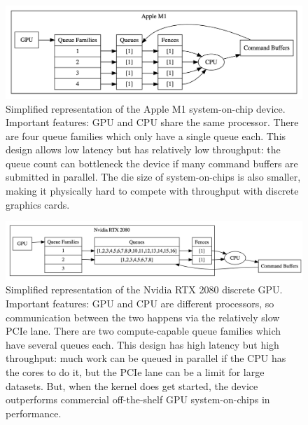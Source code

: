 \documentclass{report}
\begin{document}
\begin{figure}
  \centering
  \includegraphics[scale=0.25]{m1.png}
  \caption{Simplified representation of the Apple M1 system-on-chip device. Important features: GPU and CPU share the same processor. There are four queue families which only have a single queue each. This design allows low latency but has relatively low throughput: the queue count can bottleneck the device if many command buffers are submitted in parallel. The die size of system-on-chips is also smaller, making it physically hard to compete with throughput with discrete graphics cards.}
  \label{fig:m1}
\end{figure}

\begin{figure}
  \centering
  \includegraphics[scale=0.25]{rtx.png}
  \caption{Simplified representation of the Nvidia RTX 2080 discrete GPU. Important features: GPU and CPU are different processors, so communication between the two happens via the relatively slow PCIe lane. There are two compute-capable queue families which have several queues each. This design has high latency but high throughput: much work can be queued in parallel if the CPU has the cores to do it, but the PCIe lane can be a limit for large datasets. But, when the kernel does get started, the device outperforms commercial off-the-shelf GPU system-on-chips in performance.}
  \label{fig:rtx}
\end{figure}
\end{document}
